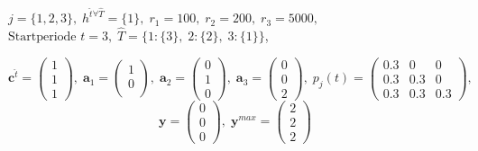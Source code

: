\begin{center}
$j = \{1, 2, 3\}, \; h^{\hat{t}\forall \hat T} = \{1\}, \; r_{1} = 100, \; r_{2} = 200, \; r_{3} = 5000,$ \\
$\text{Startperiode } t=3, \; \hat{T}= \{1: \{3\},\; 2: \{2\},\;3: \{1\} \} $,
\end{center}
\[
    \textbf{c}^{\hat{t}}=\begin{pmatrix} 1\\ 1\\ 1  \end{pmatrix}, \;
    \textbf{a}_{1}=\begin{pmatrix} 1\\ 0\\   \end{pmatrix}, \;
     \textbf{a}_{2}=\begin{pmatrix} 0\\ 1\\ 0  \end{pmatrix}, \;
       \textbf{a}_{3}=\begin{pmatrix} 0\\ 0\\ 2  \end{pmatrix}, \;
            p_{j}(t)=
       \begin{pmatrix}
       0.3 & 0 & 0 \\
0.3 & 0.3 & 0 \\
0.3 & 0.3 & 0.3
\end{pmatrix}, 
  \]
  \[
    \textbf{y}= \begin{pmatrix} 0\\ 0\\ 0  \end{pmatrix}, \;
    \textbf{y}^{max}=\begin{pmatrix} 2\\ 2\\ 2  \end{pmatrix}
      \]


